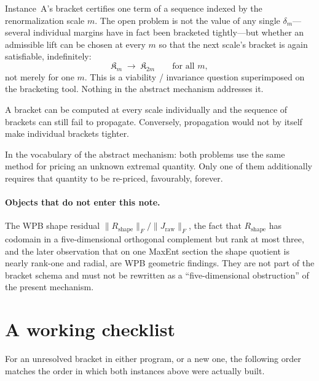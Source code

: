 \documentclass[11pt,a4paper]{article}
\newcommand{\Kfrak}{\mathfrak{K}}
\begin{document}
Instance~A's bracket certifies one term of a sequence indexed by the renormalization scale \(m\). The open problem is not the value of any single \(\delta_m\)---several individual margins have in fact been bracketed tightly---but whether an admissible lift can be chosen at every \(m\) so that the next scale's bracket is again satisfiable, indefinitely:
\begin{equation}
  \Kfrak_m \;\to\; \Kfrak_{2m}
  \qquad\text{for all }m,
\end{equation}
not merely for one \(m\). This is a viability / invariance question superimposed on the bracketing tool. Nothing in the abstract mechanism addresses it.

A bracket can be computed at every scale individually and the sequence of brackets can still fail to propagate. Conversely, propagation would not by itself make individual brackets tighter.

In the vocabulary of the abstract mechanism: both problems use the same method for pricing an unknown extremal quantity. Only one of them additionally requires that quantity to be re-priced, favourably, forever.

\paragraph{Objects that do not enter this note.}
The WPB shape residual \(\|R_{\mathrm{shape}}\|_F/\|J_{\mathrm{raw}}\|_F\), the fact that \(R_{\mathrm{shape}}\) has codomain in a five-dimensional orthogonal complement but rank at most three, and the later observation that on one MaxEnt section the shape quotient is nearly rank-one and radial, are WPB geometric findings. They are not part of the bracket schema and must not be rewritten as a ``five-dimensional obstruction'' of the present mechanism.

\section{A working checklist}

For an unresolved bracket in either program, or a new one, the following order matches the order in which both instances above were actually built.
\end{document}
